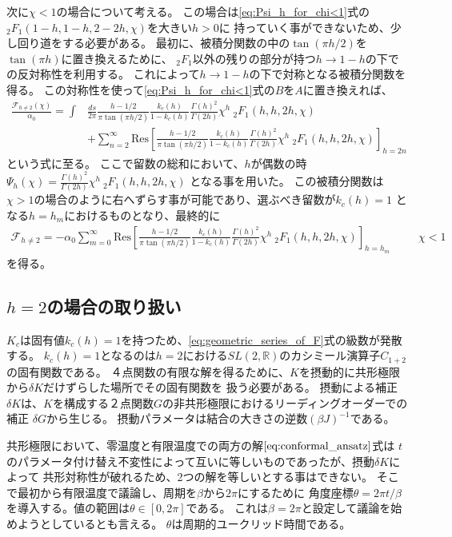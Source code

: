次に$\chi < 1$の場合について考える。
この場合は\eqref{eq:Psi_h_for_chi<1}式の${}_2F_1(1-h,1-h,2-2h,\chi)$を大きい$h > 0$に
持っていく事ができないため、少し回り道をする必要がある。
最初に、被積分関数の中の$\tan(\pi h/2)$を$\tan(\pi h)$に置き換えるために、
${}_2F_1$以外の残りの部分が持つ$h\to 1-h$の下での反対称性を利用する。
これによって$h\to 1-h$の下で対称となる被積分関数を得る。
この対称性を使って\eqref{eq:Psi_h_for_chi<1}式の$B$を$A$に置き換えれば、
\begin{align}
	\frac{\mathcal{F}_{h\neq 2}(\chi)}{\alpha_0}
	= \int &\frac{ds}{2\pi}\frac{h-1/2}{\pi\tan(\pi h/2)}
		\frac{k_c(h)}{1-k_c(h)}\frac{\Gamma(h)^2}{\Gamma(2h)}
		\chi^h\ {}_2F_1(h, h, 2h, \chi)\nonumber\\
	&+ \sum_{n=2}^{\infty}\mathrm{Res}\left[
		\frac{h-1/2}{\pi\tan(\pi h/2)}\frac{k_c(h)}{1-k_c(h)}\frac{\Gamma(h)^2}{\Gamma(2h)}
		\chi^h\ {}_2F_1(h, h, 2h, \chi)
	\right]_{h=2n}
\end{align}
という式に至る。
ここで留数の総和において、$h$が偶数の時
$\Psi_h(\chi) = \frac{\Gamma(h)^2}{\Gamma(2h)}\chi^h\ {}_2F_1(h, h, 2h, \chi)$
となる事を用いた。
この被積分関数は$\chi > 1$の場合のように右へずらす事が可能であり、選ぶべき留数が$k_c(h)=1$
となる$h = h_m$におけるものとなり、最終的に
\begin{align}
	\mathcal{F}_{h\neq 2} = -\alpha_0\sum_{m=0}^{\infty}\mathrm{Res}\left[
		\frac{h-1/2}{\pi\tan(\pi h/2)}\frac{k_c(h)}{1-k_c(h)}\frac{\Gamma(h)^2}{\Gamma(2h)}
		\chi^h\ {}_2F_1(h, h, 2h, \chi)
	\right]_{h=h_m}
	\hspace{30pt}\chi < 1
\end{align}
を得る。

\subsection{$h = 2$の場合の取り扱い}
$K_c$は固有値$k_c(h) = 1$を持つため、\eqref{eq:geometric_series_of_F}式の級数が発散する。
$k_c(h) = 1$となるのは$h = 2$における$SL(2, \mathbb{R})$のカシミール演算子$C_{1+2}$の固有関数である。
４点関数の有限な解を得るために、$K$を摂動的に共形極限から$\delta K$だけずらした場所でその固有関数を
扱う必要がある。
摂動による補正$\delta K$は、$K$を構成する２点関数$G$の非共形極限におけるリーディングオーダーでの補正
$\delta G$から生じる。
摂動パラメータは結合の大きさの逆数$(\beta J)^{-1}$である。

共形極限において、零温度と有限温度での両方の解$\eqref{eq:conformal_ansatz}$式は
$t$のパラメータ付け替え不変性によって互いに等しいものであったが、摂動$\delta K$によって
共形対称性が破れるため、2つの解を等しいとする事はできない。
そこで最初から有限温度で議論し、周期を$\beta$から$2\pi$にするために
角度座標$\theta = 2\pi t / \beta$を導入する。値の範囲は$\theta \in [0, 2\pi]$である。
これは$\beta = 2\pi$と設定して議論を始めようとしているとも言える。
$\theta$は周期的ユークリッド時間である。

